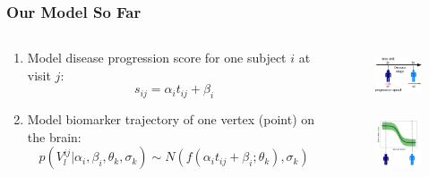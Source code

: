 \documentclass[8pt,xcolor=table]{beamer}
\begin{document}
\begin{frame}
\frametitle{Our Model So Far}

\begin{columns}[T]
    \begin{column}{.7\textwidth} %
   
     
   \begin{enumerate}      
      
      \item Model disease progression score for one subject $i$ at visit $j$:
      $$s_{ij} = \alpha_i t_{ij} + \beta_i$$
      
      \vspace{1em}
      
      \item Model biomarker trajectory of one vertex (point) on the brain:
      $$p(V_l^{ij} | \alpha_i, \beta_i, \theta_k, \sigma_k) \sim N(f(\alpha_i t_{ij} + \beta_i ; \theta_k), \sigma_k)$$
      
  
     
     \end{enumerate}
     

    \end{column}
    \begin{column}{.3\textwidth}

    \vspace{-2em}
    
    \begin{figure}
    \centering
    \includegraphics[height=1.5cm]{disease_axis.png}
    \end{figure}
    
    \begin{figure}
    \centering
    \includegraphics[height=1.5cm, trim=120 0 120 0]{Disease_progression_one_sigmoid_confidence.png}
    \end{figure}
    


\end{column}
\end{columns}
\end{frame}
\end{document}
